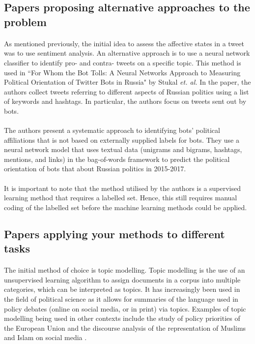 \documentclass[10pt,twocolumn,letterpaper]{article}
\begin{document}
	\subsection{Papers proposing alternative approaches to the problem}
	\paragraph{} As mentioned previously, the initial idea to assess the affective states in a tweet was to use sentiment analysis. An alternative approach is to use a neural network classifier to identify pro- and contra- tweets on a specific topic. This method is used in ``For Whom the Bot Tolls: A Neural Networks Approach to Measuring Political Orientation of Twitter Bots in Russia" by Stukal \emph{et. al.} \cite{stukal2019} In the paper, the authors collect tweets referring to different aspects of Russian politics using a list of keywords and hashtags. In particular, the authors focus on tweets sent out by bots. 
	
	\paragraph{} The authors present a systematic approach to identifying bots' political affiliations that is not based on externally supplied labels for bots. They use a neural network model that uses textual data (unigrams and bigrams, hashtags, mentions, and links) in the bag-of-words framework to predict the political orientation of bots that about Russian politics in 2015-2017. 
	
	\paragraph{} It is important to note that the method utilised by the authors is a supervised learning method that requires a labelled set. Hence, this still requires manual coding of the labelled set before the machine learning methods could be applied. 
	
	\subsection{Papers applying your methods to different tasks}
	\paragraph{} The initial method of choice is topic modelling. Topic modelling is the use of an unsupervised learning algorithm to assign documents in a corpus into multiple categories, which can be interpreted as topics. It has increasingly been used in the field of political science as it allows for summaries of the language used in policy debates (online on social media, or in print) via topics. Examples of topic modelling being used in other contexts include the study of policy priorities of the European Union \cite{isoaho2019} and the discourse analysis of the representation of Muslims and Islam on social media \cite{TORNBERG2016132}. 
	
\end{document}
